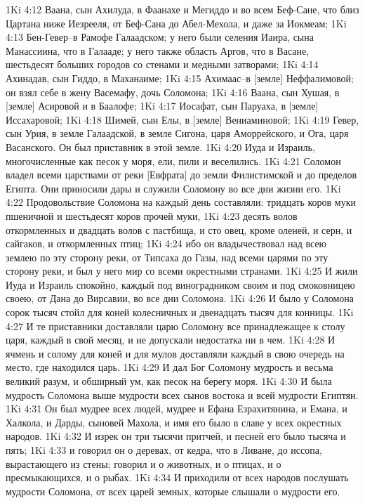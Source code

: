1Ki 4:12  Ваана, сын Ахилуда, в Фаанахе и Мегиддо и во всем Беф-Сане, что близ Цартана ниже Иезрееля, от Беф-Сана до Абел-Мехола, и даже за Иокмеам;
1Ki 4:13  Бен-Гевер--в Рамофе Галаадском; у него были селения Иаира, сына Манассиина, что в Галааде; у него также область Аргов, что в Васане, шестьдесят больших городов со стенами и медными затворами;
1Ki 4:14  Ахинадав, сын Гиддо, в Маханаиме;
1Ki 4:15  Ахимаас--в [земле] Неффалимовой; он взял себе в жену Васемафу, дочь Соломона;
1Ki 4:16  Ваана, сын Хушая, в [земле] Асировой и в Баалофе;
1Ki 4:17  Иосафат, сын Паруаха, в [земле] Иссахаровой;
1Ki 4:18  Шимей, сын Елы, в [земле] Вениаминовой;
1Ki 4:19  Гевер, сын Урия, в земле Галаадской, в земле Сигона, царя Аморрейского, и Ога, царя Васанского. Он был приставник в этой земле.
1Ki 4:20  Иуда и Израиль, многочисленные как песок у моря, ели, пили и веселились.
1Ki 4:21  Соломон владел всеми царствами от реки [Евфрата] до земли Филистимской и до пределов Египта. Они приносили дары и служили Соломону во все дни жизни его.
1Ki 4:22  Продовольствие Соломона на каждый день составляли: тридцать коров муки пшеничной и шестьдесят коров прочей муки,
1Ki 4:23  десять волов откормленных и двадцать волов с пастбища, и сто овец, кроме оленей, и серн, и сайгаков, и откормленных птиц;
1Ki 4:24  ибо он владычествовал над всею землею по эту сторону реки, от Типсаха до Газы, над всеми царями по эту сторону реки, и был у него мир со всеми окрестными странами.
1Ki 4:25  И жили Иуда и Израиль спокойно, каждый под виноградником своим и под смоковницею своею, от Дана до Вирсавии, во все дни Соломона.
1Ki 4:26  И было у Соломона сорок тысяч стойл для коней колесничных и двенадцать тысяч для конницы.
1Ki 4:27  И те приставники доставляли царю Соломону все принадлежащее к столу царя, каждый в свой месяц, и не допускали недостатка ни в чем.
1Ki 4:28  И ячмень и солому для коней и для мулов доставляли каждый в свою очередь на место, где находился царь.
1Ki 4:29  И дал Бог Соломону мудрость и весьма великий разум, и обширный ум, как песок на берегу моря.
1Ki 4:30  И была мудрость Соломона выше мудрости всех сынов востока и всей мудрости Египтян.
1Ki 4:31  Он был мудрее всех людей, мудрее и Ефана Езрахитянина, и Емана, и Халкола, и Дарды, сыновей Махола, и имя его было в славе у всех окрестных народов.
1Ki 4:32  И изрек он три тысячи притчей, и песней его было тысяча и пять;
1Ki 4:33  и говорил он о деревах, от кедра, что в Ливане, до иссопа, вырастающего из стены; говорил и о животных, и о птицах, и о пресмыкающихся, и о рыбах.
1Ki 4:34  И приходили от всех народов послушать мудрости Соломона, от всех царей земных, которые слышали о мудрости его.
